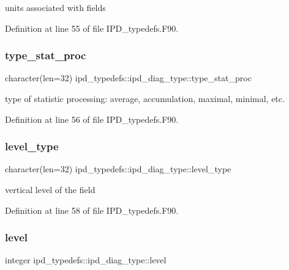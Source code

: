 units associated with fields 



Definition at line 55 of file I\+P\+D\+\_\+typedefs.\+F90.

\mbox{\label{structipd__typedefs_1_1ipd__diag__type_a39b941717014c78a145ba54d28ef4594}} 
\subsubsection{type\+\_\+stat\+\_\+proc}
{\footnotesize\ttfamily character(len=32) ipd\+\_\+typedefs\+::ipd\+\_\+diag\+\_\+type\+::type\+\_\+stat\+\_\+proc}



type of statistic processing\+: average, accumulation, maximal, minimal, etc. 



Definition at line 56 of file I\+P\+D\+\_\+typedefs.\+F90.

\mbox{\label{structipd__typedefs_1_1ipd__diag__type_a1cbc19277349f08ca1c9113f67b3ed87}} 
\subsubsection{level\+\_\+type}
{\footnotesize\ttfamily character(len=32) ipd\+\_\+typedefs\+::ipd\+\_\+diag\+\_\+type\+::level\+\_\+type}



vertical level of the field 



Definition at line 58 of file I\+P\+D\+\_\+typedefs.\+F90.

\mbox{\label{structipd__typedefs_1_1ipd__diag__type_ac7caec852190e7c39fad83c8ef64a284}} 
\subsubsection{level}
{\footnotesize\ttfamily integer ipd\+\_\+typedefs\+::ipd\+\_\+diag\+\_\+type\+::level}



